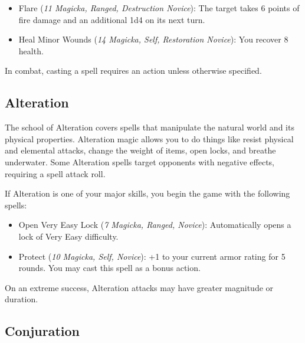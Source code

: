 \documentclass[12pt]{book}
\begin{document}
\begin{itemize}
	\item Flare (\textit{11 Magicka, Ranged, Destruction Novice}): The target takes 6 points of fire damage and an additional 1d4 on its next turn.
	\item Heal Minor Wounds (\textit{14 Magicka, Self, Restoration Novice}): You recover 8 health.
\end{itemize}

In combat, casting a spell requires an action unless otherwise specified.

\subsection{Alteration}

The school of Alteration covers spells that manipulate the natural world and its physical properties. Alteration magic allows you to do things like resist physical and elemental attacks, change the weight of items, open locks, and breathe underwater. Some Alteration spells target opponents with negative effects, requiring a spell attack roll.

If Alteration is one of your major skills, you begin the game with the following spells:
\begin{itemize}
	\item Open Very Easy Lock (\textit{7 Magicka, Ranged, Novice}): Automatically opens a lock of Very Easy difficulty.
	\item Protect (\textit{10 Magicka, Self, Novice}): +1 to your current armor rating for 5 rounds. You may cast this spell as a bonus action.
\end{itemize}

On an extreme success, Alteration attacks may have greater magnitude or duration.

\newpage
\subsection{Conjuration}
\end{document}
